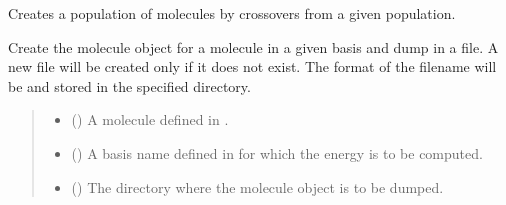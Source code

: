 \documentclass[letterpaper,10pt,english]{sphinxmanual}
\begin{document}

\begin{fulllineitems}
\label{\detokenize{api:MSTOOpt.CrossOvers}}
\pysigstartsignatures
\pysiglinewithargsret
{}
{}
{}
\pysigstopsignatures
\sphinxAtStartPar
Creates a population of molecules by crossovers from a given population.

\end{fulllineitems}


\begin{fulllineitems}
\label{\detokenize{api:MSTOOpt.DumpStandardBasis}}
\pysigstartsignatures
\pysiglinewithargsret
{}
{\sphinxparamcomma {}\sphinxparamcomma {}}
{}
\pysigstopsignatures
\sphinxAtStartPar
Create the molecule object for a molecule in a given basis and dump in a file. 
A new file will be created only if it does not exist. 
The format of the filename will be  and stored in the specified directory.
\begin{quote}\begin{description}
\begin{itemize}
\item {} 
\sphinxAtStartPar
{} () \textendash{} A molecule defined in {\hyperref[\detokenize{api:MSTOOpt.moldict}]{}}.

\item {} 
\sphinxAtStartPar
{} () \textendash{} A basis name defined in  for which the energy is to be computed.

\item {} 
\sphinxAtStartPar
{} () \textendash{} The directory where the molecule object is to be dumped.


\end{itemize}
\end{description}
\end{quote}
\end{fulllineitems}
\end{document}
